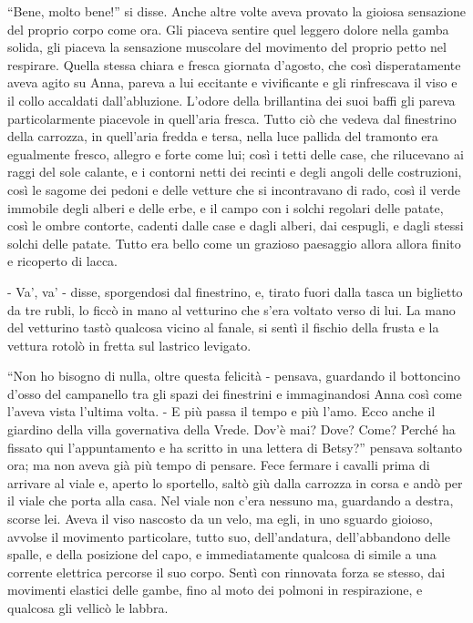 ``Bene, molto bene!'' si disse. Anche altre volte aveva provato la gioiosa sensazione del proprio corpo come ora. Gli piaceva sentire quel leggero dolore nella gamba solida, gli piaceva la sensazione muscolare del movimento del proprio petto nel respirare. Quella stessa chiara e fresca giornata d'agosto, che così disperatamente aveva agito su Anna, pareva a lui eccitante e vivificante e gli rinfrescava il viso e il collo accaldati dall'abluzione. L'odore della brillantina dei suoi baffi gli pareva particolarmente piacevole in quell'aria fresca. Tutto ciò che vedeva dal finestrino della carrozza, in quell'aria fredda e tersa, nella luce pallida del tramonto era egualmente fresco, allegro e forte come lui; così i tetti delle case, che rilucevano ai raggi del sole calante, e i contorni netti dei recinti e degli angoli delle costruzioni, così le sagome dei pedoni e delle vetture che si incontravano di rado, così il verde immobile degli alberi e delle erbe, e il campo con i solchi regolari delle patate, così le ombre contorte, cadenti dalle case e dagli alberi, dai cespugli, e dagli stessi solchi delle patate. Tutto era bello come un grazioso paesaggio allora allora finito e ricoperto di lacca. 

- Va', va' - disse, sporgendosi dal finestrino, e, tirato fuori dalla tasca un biglietto da tre rubli, lo ficcò in mano al vetturino che s'era voltato verso di lui. La mano del vetturino tastò qualcosa vicino al fanale, si sentì il fischio della frusta e la vettura rotolò in fretta sul lastrico levigato. 

``Non ho bisogno di nulla, oltre questa felicità - pensava, guardando il bottoncino d'osso del campanello tra gli spazi dei finestrini e immaginandosi Anna così come l'aveva vista l'ultima volta. - E più passa il tempo e più l'amo. Ecco anche il giardino della villa governativa della Vrede. Dov'è mai? Dove? Come? Perché ha fissato qui l'appuntamento e ha scritto in una lettera di Betsy?'' pensava soltanto ora; ma non aveva già più tempo di pensare. Fece fermare i cavalli prima di arrivare al viale e, aperto lo sportello, saltò giù dalla carrozza in corsa e andò per il viale che porta alla casa. Nel viale non c'era nessuno ma, guardando a destra, scorse lei. Aveva il viso nascosto da un velo, ma egli, in uno sguardo gioioso, avvolse il movimento particolare, tutto suo, dell'andatura, dell'abbandono delle spalle, e della posizione del capo, e immediatamente qualcosa di simile a una corrente elettrica percorse il suo corpo. Sentì con rinnovata forza se stesso, dai movimenti elastici delle gambe, fino al moto dei polmoni in respirazione, e qualcosa gli vellicò le labbra. 

